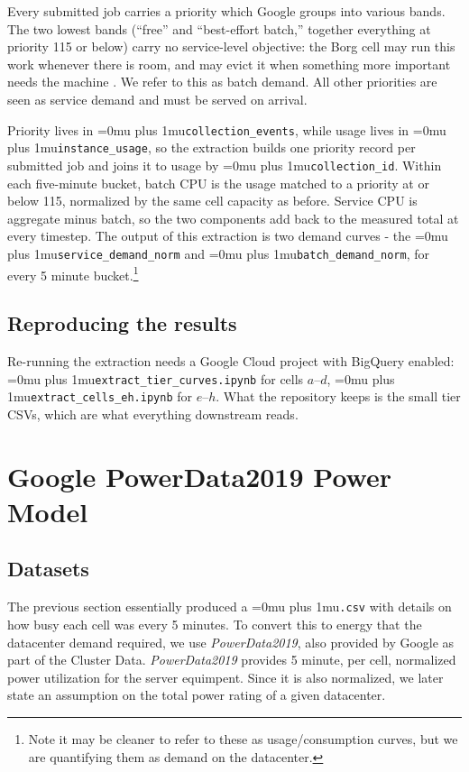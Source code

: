\documentclass[conference]{IEEEtran}
\newcommand{\codepath}[1]{{\Urlmuskip=0mu plus 1mu\relax\nolinkurl{#1}}}
\begin{document}
Every submitted job carries a priority which Google groups into various bands. The two lowest bands (``free'' and ``best-effort batch,'' together everything at priority 115 or below) carry no service-level objective: the Borg cell may run this work whenever there is room, and may evict it when something more important needs the machine \cite{googleClusterAnalysisColab}. We refer to this as batch demand. All other priorities are seen as service demand and must be served on arrival.

Priority lives in \codepath{collection_events}, while usage lives in \codepath{instance_usage}, so the extraction builds one priority record per submitted job and joins it to usage by \codepath{collection_id}. Within each five-minute bucket, batch CPU is the usage matched to a priority at or below 115, normalized by the same cell capacity as before. Service CPU is aggregate minus batch, so the two components add back to the measured total at every timestep. The output of this extraction is two demand curves - the \codepath{service_demand_norm} and \codepath{batch_demand_norm}, for every 5 minute bucket.\footnote{Note it may be cleaner to refer to these as usage/consumption curves, but we are quantifying them as demand on the datacenter.}

\subsection{Reproducing the results}
\label{subsec:clusterdata-artifacts}

Re-running the extraction needs a Google Cloud project with BigQuery  enabled: \codepath{extract_tier_curves.ipynb} for cells \(a\)--\(d\), \codepath{extract_cells_eh.ipynb} for \(e\)--\(h\). What the repository keeps is the small tier CSVs, which are what everything downstream reads. 

\section{Google PowerData2019 Power Model}
\label{sec:powerdata2019}

\subsection{Datasets}
\label{subsec:powerdata-purpose}

The previous section essentially produced a \codepath{.csv} with details on how busy each cell was every 5 minutes. To convert this to energy that the datacenter demand required, we use \emph{PowerData2019}, also provided by Google as part of the Cluster Data. \emph{PowerData2019} provides 5 minute, per cell, normalized power utilization for the server equimpent. Since it is also normalized, we later state an assumption on the total power rating of a given datacenter.
\end{document}
